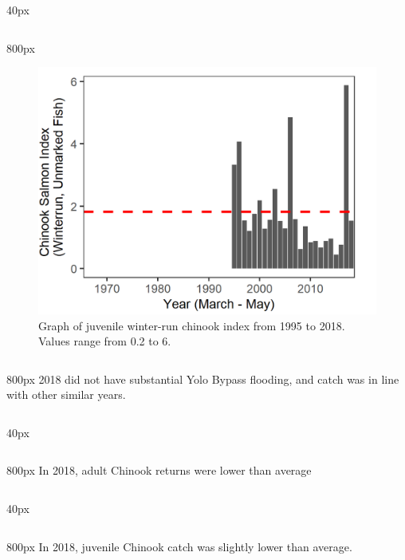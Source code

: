 \documentclass[
]{book}
\begin{document}
\begin{column}{40px\textwidth}
~
\end{column}

\begin{column}{800px\textwidth}
\begin{figure}
\includegraphics[width=15.25in]{figures/DJFMP_chinook_winterByLength_allyears} \caption{Graph of juvenile winter-run chinook index from 1995 to 2018. Values range from 0.2 to 6.}\label{fig:unnamed-chunk-37}
\end{figure}
\end{column}

\begin{column}{800px\textwidth}
2018 did not have substantial Yolo Bypass flooding, and catch was in line with other similar years.
\end{column}

\begin{column}{40px\textwidth}
~
\end{column}

\begin{column}{800px\textwidth}
In 2018, adult Chinook returns were lower than average
\end{column}

\begin{column}{40px\textwidth}
~
\end{column}

\begin{column}{800px\textwidth}
In 2018, juvenile Chinook catch was slightly lower than average.
\end{column}
\end{document}
